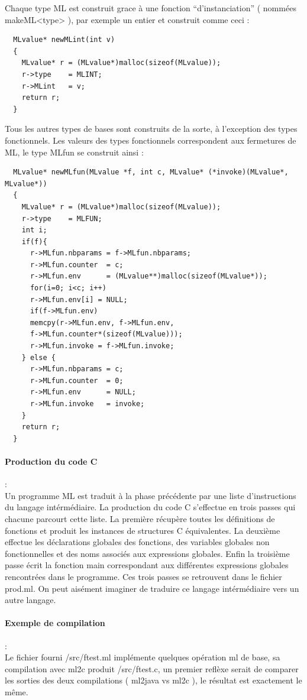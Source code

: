 \documentclass[a4paper, 11pt]{article}
\begin{document}
Chaque type ML est construit grace à une fonction ``d'instanciation'' ( nommées makeML<type> ), par exemple un entier et construit comme ceci :
\begin{lstlisting}
  MLvalue* newMLint(int v)
  {
    MLvalue* r = (MLvalue*)malloc(sizeof(MLvalue));
    r->type    = MLINT;
    r->MLint   = v;
    return r;
  }
\end{lstlisting}

Tous les autres types de bases sont construits de la sorte, à l'exception des types fonctionnels. Les valeurs des types fonctionnels correspondent aux fermetures de ML, le type MLfun se construit ainsi :
\begin{lstlisting}
  MLvalue* newMLfun(MLvalue *f, int c, MLvalue* (*invoke)(MLvalue*, MLvalue*))
  {
    MLvalue* r = (MLvalue*)malloc(sizeof(MLvalue));
    r->type    = MLFUN;
    int i;
    if(f){
      r->MLfun.nbparams = f->MLfun.nbparams;
      r->MLfun.counter  = c;
      r->MLfun.env      = (MLvalue**)malloc(sizeof(MLvalue*));
      for(i=0; i<c; i++)
      r->MLfun.env[i] = NULL;
      if(f->MLfun.env)
      memcpy(r->MLfun.env, f->MLfun.env,
      f->MLfun.counter*(sizeof(MLvalue)));
      r->MLfun.invoke = f->MLfun.invoke;
    } else {
      r->MLfun.nbparams = c;
      r->MLfun.counter  = 0;
      r->MLfun.env      = NULL;
      r->MLfun.invoke   = invoke;
    }
    return r;
  }
\end{lstlisting}

\paragraph{Production du code C} : \\
Un programme ML est traduit à la phase précédente par une liste d'instructions du langage intérmédiaire. La production du code C s'effectue en trois passes qui chacune parcourt cette liste. La première récupère toutes les définitions de fonctions et produit les instances de structures C équivalentes. La deuxième effectue les déclarations globales des fonctions, des variables globales non fonctionnelles et des noms associés aux expressions globales. Enfin la troisième passe écrit la fonction main correspondant aux différentes expressions globales rencontrées dans le programme. Ces trois passes se retrouvent dans le fichier prod.ml. On peut aisément imaginer de traduire ce langage intérmédiaire vers un autre langage.

\paragraph{Exemple de compilation} : \\
Le fichier fourni /src/ftest.ml implémente quelques opération ml de base, sa compilation avec ml2c produit /src/ftest.c, un premier reflèxe serait de comparer les sorties des deux compilations ( ml2java vs ml2c ), le résultat est exactement le même.
\end{document}
